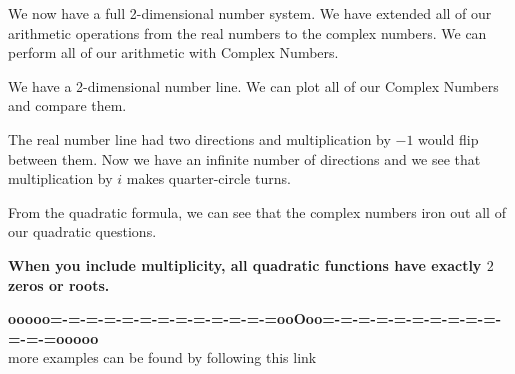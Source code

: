 \documentclass{ximera}
\begin{document}
We now have a full 2-dimensional number system.  We have extended all of our arithmetic operations from the real numbers to the complex numbers.  We can perform all of our arithmetic with Complex Numbers.



We have a 2-dimensional number line. We can plot all of our Complex Numbers and compare them.

The real number line had two directions and multiplication by $-1$ would flip between them.  Now we have an infinite number of directions and we see that multiplication by $i$ makes quarter-circle turns.

From the quadratic formula, we can see that the complex numbers iron out all of our quadratic questions.

\begin{center}
\textbf{\textcolor{red!80!black}{When you include multiplicity, all quadratic functions have exactly $2$ zeros or roots.}}
\end{center}


























\begin{center}
\textbf{\textcolor{green!50!black}{ooooo=-=-=-=-=-=-=-=-=-=-=-=-=ooOoo=-=-=-=-=-=-=-=-=-=-=-=-=ooooo}} \\

more examples can be found by following this link\\ 

\end{center}
\end{document}
